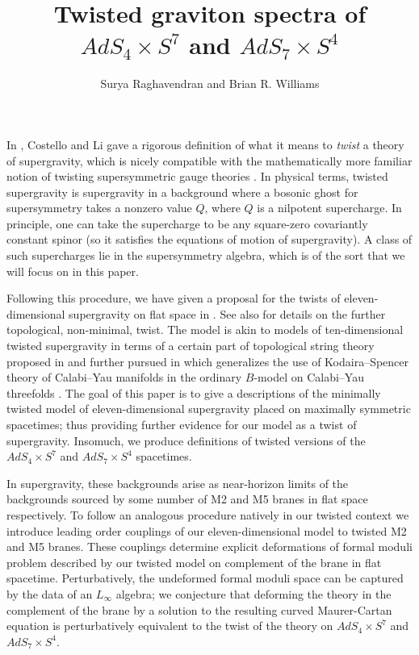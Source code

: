 \documentclass{amsart}
\title{Twisted graviton spectra of $AdS_4\times S^7$ and $AdS_7\times S^4$}
\author{Surya Raghavendran and Brian R. Williams}
\begin{document}
\maketitle

\begin{abstract} %
\end{abstract}

\tableofcontents

In \cite{CLsugra}, Costello and Li gave a rigorous definition of what it means to {\em twist} a theory of supergravity, which is nicely compatible with the mathematically more familiar notion of twisting supersymmetric gauge theories \cite{WittenTwist}.
In physical terms, twisted supergravity is supergravity in a background where a bosonic ghost for supersymmetry takes a nonzero value $Q$, where $Q$ is a nilpotent supercharge.
In principle, one can take the supercharge to be any square-zero covariantly constant spinor (so it satisfies the equations of motion of supergravity).
A class of such supercharges lie in the supersymmetry algebra, which is of the sort that we will focus on in this paper.

Following this procedure, we have given a proposal for the twists of eleven-dimensional supergravity on flat space in \cite{RSW,SWspinor}.
See also \cite{EHsugra} for details on the further topological, non-minimal, twist.
The model is akin to models of ten-dimensional twisted supergravity in terms of a certain part of topological string theory proposed in \cite{CLsugra} and further pursued in \cite{CLtypeI,CLbcov,CPkoszul} which generalizes the use of Kodaira--Spencer theory of Calabi--Yau manifolds in the ordinary $B$-model on Calabi--Yau threefolds \cite{bcov}.
The goal of this paper is to give a descriptions of the minimally twisted model of eleven-dimensional supergravity placed on maximally symmetric spacetimes; thus providing further evidence for our model as a twist of supergravity.
Insomuch, we produce definitions of twisted versions of the $AdS_4\times S^7$ and $AdS_7\times S^4$ spacetimes.

In supergravity, these backgrounds arise as near-horizon limits of the backgrounds sourced by some number of M2 and M5 branes in flat space respectively. 
To follow an analogous procedure natively in our twisted context we introduce leading order couplings of our eleven-dimensional model to twisted M2 and M5 branes. 
These couplings determine explicit deformations of formal moduli problem described by our twisted model on complement of the brane in flat spacetime.
Perturbatively, the undeformed formal moduli space can be captured by the data of an $L_\infty$ algebra; we conjecture that deforming the theory in the complement of the brane by a solution to the resulting curved Maurer-Cartan equation is perturbatively equivalent to the twist of the theory on $AdS_4\times S^7$ and $AdS_7\times S^4$.
\end{document}
